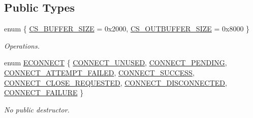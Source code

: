\subsection*{\-Public \-Types}
\begin{DoxyCompactItemize}
\item 
enum \{ \hyperlink{class_c_p_connection_a806d0ccf9284ab6cfa8f9f638df5b8e5a212b310ed9516ad4edce81eb3f615a90}{\-C\-S\-\_\-\-B\-U\-F\-F\-E\-R\-\_\-\-S\-I\-Z\-E} =  0x2000, 
\hyperlink{class_c_p_connection_a806d0ccf9284ab6cfa8f9f638df5b8e5ae1bfa53acfedd84586f9577402592e70}{\-C\-S\-\_\-\-O\-U\-T\-B\-U\-F\-F\-E\-R\-\_\-\-S\-I\-Z\-E} =  0x8000
 \}
\begin{DoxyCompactList}\small\item\em \-Operations. \end{DoxyCompactList}\item 
enum \hyperlink{class_c_p_connection_a0b9dfdba3bf3fb022507756c5eff7bde}{\-E\-C\-O\-N\-N\-E\-C\-T} \{ \*
\hyperlink{class_c_p_connection_a0b9dfdba3bf3fb022507756c5eff7bdeab33cb29fa6b86f5a9764b5a6ff6b9f98}{\-C\-O\-N\-N\-E\-C\-T\-\_\-\-U\-N\-U\-S\-E\-D}, 
\hyperlink{class_c_p_connection_a0b9dfdba3bf3fb022507756c5eff7bdeaa739beea3c36f54a1e48e309477fdecd}{\-C\-O\-N\-N\-E\-C\-T\-\_\-\-P\-E\-N\-D\-I\-N\-G}, 
\hyperlink{class_c_p_connection_a0b9dfdba3bf3fb022507756c5eff7bdead9adca01889d40665ea46c97029bf07b}{\-C\-O\-N\-N\-E\-C\-T\-\_\-\-A\-T\-T\-E\-M\-P\-T\-\_\-\-F\-A\-I\-L\-E\-D}, 
\hyperlink{class_c_p_connection_a0b9dfdba3bf3fb022507756c5eff7bdea414416c17cf4d03572ea886af634c463}{\-C\-O\-N\-N\-E\-C\-T\-\_\-\-S\-U\-C\-C\-E\-S\-S}, 
\*
\hyperlink{class_c_p_connection_a0b9dfdba3bf3fb022507756c5eff7bdea9a83b86ee125293f6d73d8afec74a145}{\-C\-O\-N\-N\-E\-C\-T\-\_\-\-C\-L\-O\-S\-E\-\_\-\-R\-E\-Q\-U\-E\-S\-T\-E\-D}, 
\hyperlink{class_c_p_connection_a0b9dfdba3bf3fb022507756c5eff7bdead12aa45cdb80e03a24de39dff800f4ae}{\-C\-O\-N\-N\-E\-C\-T\-\_\-\-D\-I\-S\-C\-O\-N\-N\-E\-C\-T\-E\-D}, 
\hyperlink{class_c_p_connection_a0b9dfdba3bf3fb022507756c5eff7bdeaf31728d4a1b415f3076875e6ac69053b}{\-C\-O\-N\-N\-E\-C\-T\-\_\-\-F\-A\-I\-L\-U\-R\-E}
 \}
\begin{DoxyCompactList}\small\item\em \-No public destructor. \end{DoxyCompactList}\end{DoxyCompactItemize}
